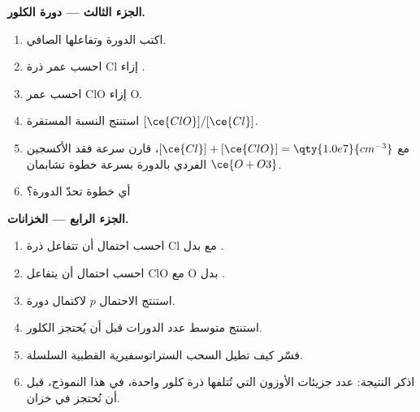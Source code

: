 \begin{problem}
\medskip\noindent\textbf{الجزء الثالث --- دورة الكلور.}
\begin{enumerate}[resume]
  \item اكتب الدورة وتفاعلها الصافي.
  \item احسب عمر ذرة Cl إزاء .
  \item احسب عمر ClO إزاء O.
  \item استنتج النسبة المستقرة $[\ce{ClO}]/[\ce{Cl}]$.
  \item مع $[\ce{Cl}] + [\ce{ClO}] = \qty{1.0e7}{cm^{-3}}$، قارن سرعة فقد الأكسجين الفردي بالدورة
        بسرعة خطوة تشابمان $\ce{O + O3}$.
  \item أي خطوة تحدّ الدورة؟
\end{enumerate}

\medskip\noindent\textbf{الجزء الرابع --- الخزانات.}
\begin{enumerate}[resume]
  \item احسب احتمال أن تتفاعل ذرة Cl مع  بدل
        .
  \item احسب احتمال أن يتفاعل ClO مع O بدل .
  \item استنتج الاحتمال $p$ لاكتمال دورة.
  \item استنتج متوسط عدد الدورات قبل أن يُحتجز الكلور.
  \item فسّر كيف تطيل السحب الستراتوسفيرية القطبية السلسلة.
  \item اذكر النتيجة: عدد جزيئات الأوزون التي تُتلفها ذرة كلور
        واحدة، في هذا النموذج، قبل أن تُحتجز في خزان.
\end{enumerate}
\end{problem}
